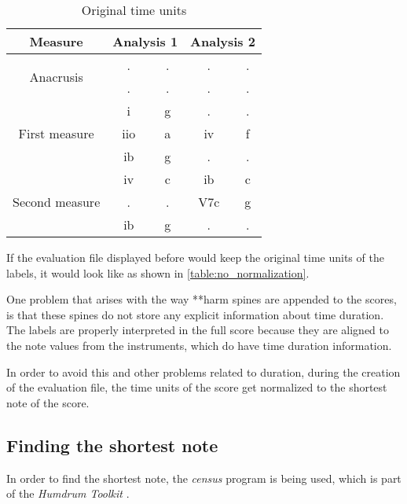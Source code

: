 		\begin{table}[tbp]
		\centering
		\begin{tabular}{|c|c|c|c|c|}
		\hline
		Measure & \multicolumn{2}{c|}{Analysis 1} & \multicolumn{2}{c|}{Analysis 2} \\ \hline
		\multirow{2}{*}{Anacrusis} & . & . & . & . \\ \cline{2-5}
		 & . & . & . & . \\ \hline
		\multirow{3}{*}{First measure} & i & g & . & . \\ \cline{2-5}
		 & iio & a & iv & f \\ \cline{2-5}
		 & ib & g & . & . \\ \hline
		\multirow{3}{*}{Second measure} & iv & c & ib & c \\ \cline{2-5}
		 & . & . & V7c & g \\ \cline{2-5}
		 & ib & g & . & . \\ \hline
		\end{tabular}
		\caption{Original time units}
		\label{table:no_normalization}
		\end{table}

		If the evaluation file displayed before would keep the original time units of the labels, it would look like as shown in \autoref{table:no_normalization}.

		One problem that arises with the way **harm spines are appended to the scores, is that these spines do not store any explicit information about time duration. The labels are properly interpreted in the full score because they are aligned to the note values from the instruments, which do have time duration information.

		In order to avoid this and other problems related to duration, during the creation of the evaluation file, the time units of the score get normalized to the shortest note of the score.

	\subsection{Finding the shortest note}
		In order to find the shortest note, the \emph{census} program is being used, which is part of the \emph{Humdrum Toolkit} \cite{humdrum}.

